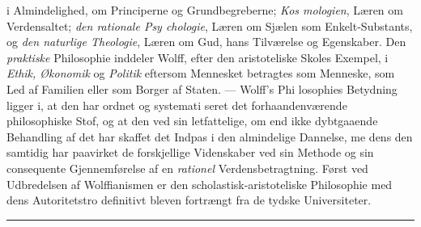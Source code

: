 \documentclass[12pt,a4paper]{book}
\newcommand{\divrule}{\begin{center}\rule{2cm}{0.4pt}\end{center}}
\begin{document}
i Almindelighed, om Principerne og Grundbegreberne; \emph{Kos\-%
mologien}, Læren om Verdensaltet; \emph{den rationale Psy\-%
chologie}, Læren om Sjælen som Enkelt-Substants, og \emph{den
naturlige Theologie}, Læren om Gud, hans Tilværelse og
Egenskaber. Den \emph{praktiske} Philosophie inddeler Wolff, efter
den aristoteliske Skoles Exempel, i \emph{Ethik, Økonomik} og
\emph{Politik} eftersom Mennesket betragtes som Menneske, som
Led af Familien eller som Borger af Staten. --- Wolff's Phi\-%
losophies Betydning ligger i, at den har ordnet og systemati\-%
seret det forhaandenværende philosophiske Stof, og at den
ved sin letfattelige, om end ikke dybtgaaende Behandling af
det har skaffet det Indpas i den almindelige Dannelse, me\-%
dens den samtidig har paavirket de forskjellige Videnskaber
ved sin Methode og sin consequente Gjennemførelse af en
\emph{rationel} Verdensbetragtning. Først ved Udbredelsen af
Wolffianismen er den scholastisk-aristoteliske Philosophie med
dens Autoritetstro definitivt bleven fortrængt fra de tydske
Universiteter.

\divrule
\end{document}
